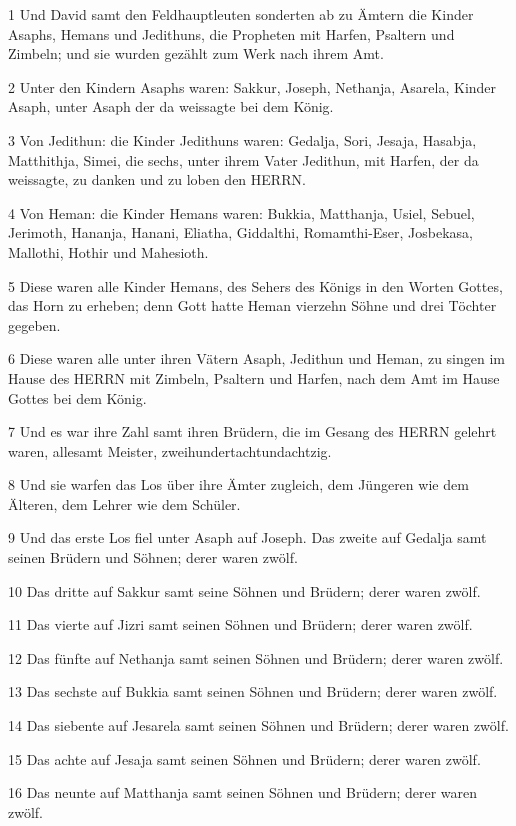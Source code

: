 \par 1 Und David samt den Feldhauptleuten sonderten ab zu Ämtern die Kinder Asaphs, Hemans und Jedithuns, die Propheten mit Harfen, Psaltern und Zimbeln; und sie wurden gezählt zum Werk nach ihrem Amt.
\par 2 Unter den Kindern Asaphs waren: Sakkur, Joseph, Nethanja, Asarela, Kinder Asaph, unter Asaph der da weissagte bei dem König.
\par 3 Von Jedithun: die Kinder Jedithuns waren: Gedalja, Sori, Jesaja, Hasabja, Matthithja, Simei, die sechs, unter ihrem Vater Jedithun, mit Harfen, der da weissagte, zu danken und zu loben den HERRN.
\par 4 Von Heman: die Kinder Hemans waren: Bukkia, Matthanja, Usiel, Sebuel, Jerimoth, Hananja, Hanani, Eliatha, Giddalthi, Romamthi-Eser, Josbekasa, Mallothi, Hothir und Mahesioth.
\par 5 Diese waren alle Kinder Hemans, des Sehers des Königs in den Worten Gottes, das Horn zu erheben; denn Gott hatte Heman vierzehn Söhne und drei Töchter gegeben.
\par 6 Diese waren alle unter ihren Vätern Asaph, Jedithun und Heman, zu singen im Hause des HERRN mit Zimbeln, Psaltern und Harfen, nach dem Amt im Hause Gottes bei dem König.
\par 7 Und es war ihre Zahl samt ihren Brüdern, die im Gesang des HERRN gelehrt waren, allesamt Meister, zweihundertachtundachtzig.
\par 8 Und sie warfen das Los über ihre Ämter zugleich, dem Jüngeren wie dem Älteren, dem Lehrer wie dem Schüler.
\par 9 Und das erste Los fiel unter Asaph auf Joseph. Das zweite auf Gedalja samt seinen Brüdern und Söhnen; derer waren zwölf.
\par 10 Das dritte auf Sakkur samt seine Söhnen und Brüdern; derer waren zwölf.
\par 11 Das vierte auf Jizri samt seinen Söhnen und Brüdern; derer waren zwölf.
\par 12 Das fünfte auf Nethanja samt seinen Söhnen und Brüdern; derer waren zwölf.
\par 13 Das sechste auf Bukkia samt seinen Söhnen und Brüdern; derer waren zwölf.
\par 14 Das siebente auf Jesarela samt seinen Söhnen und Brüdern; derer waren zwölf.
\par 15 Das achte auf Jesaja samt seinen Söhnen und Brüdern; derer waren zwölf.
\par 16 Das neunte auf Matthanja samt seinen Söhnen und Brüdern; derer waren zwölf.
